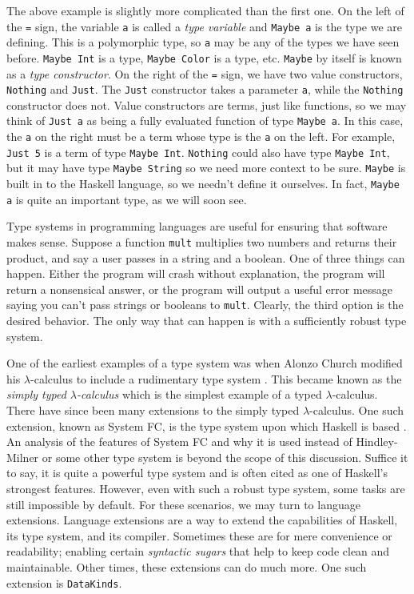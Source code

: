 \documentclass[MS, xcolor=dvipsnames]{wfuthesis}
\theoremstyle{definition}
\begin{document}
The above example is slightly more complicated than the first one. On the left of the \lstinline{=} sign, the variable \lstinline{a} is called a \emph{type variable} and \lstinline{Maybe a} is the type we are defining. This is a polymorphic type, so \lstinline{a} may be any of the types we have seen before. \lstinline{Maybe Int} is a type, \lstinline{Maybe Color} is a type, etc. \lstinline{Maybe} by itself is known as a \emph{type constructor}. On the right of the \lstinline{=} sign, we have two value constructors, \lstinline{Nothing} and \lstinline{Just}. The \lstinline{Just} constructor takes a parameter \lstinline{a}, while the \lstinline{Nothing} constructor does not. Value constructors are terms, just like functions, so we may think of \lstinline{Just a} as being a fully evaluated function of type \lstinline{Maybe a}. In this case, the \lstinline{a} on the right must be a term whose type is the \lstinline{a} on the left. For example, \lstinline{Just 5} is a term of type \lstinline{Maybe Int}. \lstinline{Nothing} could also have type \lstinline{Maybe Int}, but it may have type \lstinline{Maybe String} so we need more context to be sure. \lstinline{Maybe} is built in to the Haskell language, so we needn't define it ourselves. In fact, \lstinline{Maybe a} is quite an important type, as we will soon see. \par 
Type systems in programming languages are useful for ensuring that software makes sense. Suppose a function \lstinline{mult} multiplies two numbers and returns their product, and say a user passes in a string and a boolean. One of three things can happen. Either the program will crash without explanation, the program will return a nonsensical answer, or the program will output a useful error message saying you can't pass strings or booleans to \lstinline{mult}. Clearly, the third option is the desired behavior. The only way that can happen is with a sufficiently robust type system. \par 
One of the earliest examples of a type system was when Alonzo Church modified his $\lambda$-calculus to include a rudimentary type system \cite{Church1940}. This became known as the \emph{simply typed $\lambda$-calculus} which is the simplest example of a typed $\lambda$-calculus. There have since been many extensions to the simply typed $\lambda$-calculus. One such extension, known as System FC, is the type system upon which Haskell is based \cite{Eisenberg2013}. An analysis of the features of System FC and why it is used instead of Hindley-Milner or some other type system is beyond the scope of this discussion. Suffice it to say, it is quite a powerful type system and is often cited as one of Haskell's strongest features. However, even with such a robust type system, some tasks are still impossible by default. For these scenarios, we may turn to language extensions. Language extensions are a way to extend the capabilities of Haskell, its type system, and its compiler. Sometimes these are for mere convenience or readability; enabling certain \emph{syntactic sugars} that help to keep code clean and maintainable. Other times, these extensions can do much more. One such extension is \lstinline{DataKinds}. \par 
\end{document}

